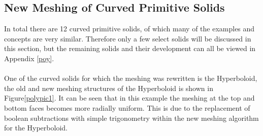 \documentclass[12pt,a4paper]{article}
\begin{document}
\subsection{New Meshing of Curved Primitive Solids}
In total there are 12 curved primitive solids, of which many of the examples and concepts are very similar. Therefore only a few select solids will be discussed in this section, but the remaining solids and their development can all be viewed in Appendix \ref{poy}.
\\\\
One of the curved solids for which the meshing was rewritten is the Hyperboloid, the old and new meshing structures of the Hyperboloid is shown in Figure\ref{polypic1}. It can be seen that in this example the meshing at the top and bottom faces becomes more radially uniform. This is due to the replacement of boolean subtractions with simple trigonometry within the new meshing algorithm for the Hyperboloid.
\\\\
\end{document}
